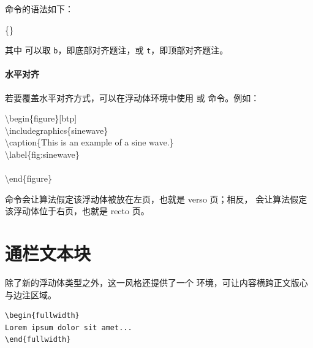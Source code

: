 \noindent {} 命令的语法如下：

\begin{docspec}
  \{\}
\end{docspec}

\noindent 其中  可以取 \texttt{b}，即底部对齐题注，或 \texttt{t}，即顶部对齐题注。

\paragraph{水平对齐}\label{par:overriding-horizontal}
若要覆盖水平对齐方式，可以在浮动体环境中使用  或  命令。例如：

\begin{fullwidth}
\begin{docspec}
  \textbackslash begin\{figure\}[btp]\\
  \qquad \textbackslash includegraphics\{sinewave\}\\
  \qquad \textbackslash caption\{This is an example of a sine wave.\}\\
  \qquad \textbackslash label\{fig:sinewave\}\\
  \qquad {}\\
  \textbackslash end\{figure\}
\end{docspec}
\end{fullwidth}

 命令会让算法假定该浮动体被放在左页，也就是 verso 页；相反， 会让算法假定该浮动体位于右页，也就是 recto 页。


\section{通栏文本块}

除了新的浮动体类型之外，这一风格还提供了一个  环境，可让内容横跨正文版心与边注区域。

\begin{Verbatim}
\begin{fullwidth}
Lorem ipsum dolor sit amet...
\end{fullwidth}
\end{Verbatim}

\begin{fullwidth}
\small\itshape\lipsum[1]
\end{fullwidth}

